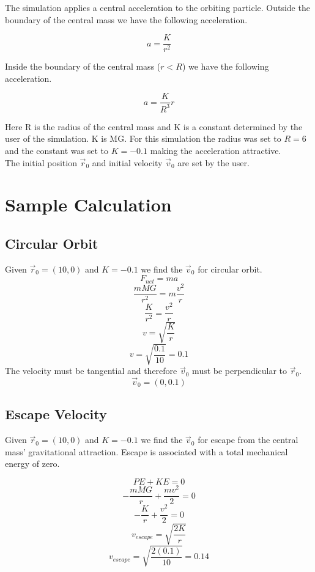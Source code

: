 \documentclass{article}
\begin{document}
The simulation applies a central acceleration to the orbiting particle.  Outside the boundary of the central mass we have the following acceleration.

$$a=\frac{K}{r^2}$$

Inside the boundary of the central mass ($r<R$) we have the following acceleration.

$$a=\frac{K}{R^3}r$$

Here R is the radius of the central mass and K is a constant determined by the user of the simulation.  K is MG.  For this simulation the radius was set to $R=6$ and the constant was set to $K=-0.1$ making the acceleration attractive.\\

The initial position $\overrightarrow{r}_0$ and initial velocity $\overrightarrow{v}_0$ are set by the user.

\newpage

\section{Sample Calculation}
\subsection{Circular Orbit}
Given $\overrightarrow{r}_0=(10,0)$ and $K=-0.1$ we find the $\overrightarrow{v}_0$ for circular orbit.
$$F_{net}=ma$$
$$ \frac{mMG}{r^2} = m \frac{v^2}{r}$$
$$ \frac{K}{r^2} = \frac{v^2}{r}$$
$$v=\sqrt{\frac{K}{r}}$$
$$v=\sqrt{\frac{0.1}{10}}=0.1$$
The velocity must be tangential and therefore $\overrightarrow{v}_0$ must be perpendicular to $\overrightarrow{r}_0$.
$$\overrightarrow{v}_0=(0,0.1)$$

\subsection{Escape Velocity}
Given $\overrightarrow{r}_0=(10,0)$ and $K=-0.1$ we find the $\overrightarrow{v}_0$ for escape from the central mass' gravitational attraction.  Escape is associated with a total mechanical energy of zero.

$$PE+KE=0$$
$$-\frac{mMG}{r}+\frac{mv^2}{2}=0 $$
$$-\frac{K}{r}+\frac{v^2}{2}=0 $$
$$v_{escape}=\sqrt{\frac{2K}{r}}$$
$$v_{escape}=\sqrt{\frac{2(0.1)}{10}}=0.14$$
\end{document}
